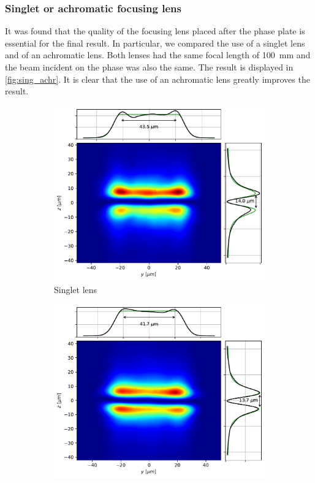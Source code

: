 \subsubsection{Singlet or achromatic focusing lens}
It was found that the quality of the focusing lens placed after the phase plate is essential for the final result. In particular, we compared the use of a singlet lens and of an achromatic lens. Both lenses had the same focal length of \SI{100}{mm} and the beam incident on the phase was also the same. The result is displayed in \cref{fig:sing_achr}. It is clear that the use of an achromatic lens greatly improves the result.
\begin{figure}
    \centering
    \begin{subfigure}{0.45\textwidth}
        \includegraphics[width=\textwidth]{chapters/chapter_3/figures/sing.pdf}
        \caption{Singlet lens}
        \label{fig:singlet}
    \end{subfigure}
    \hfill
    \begin{subfigure}{0.45\textwidth}
        \includegraphics[width=\textwidth]{chapters/chapter_3/figures/achr.pdf}

\end{subfigure}
\end{figure}

